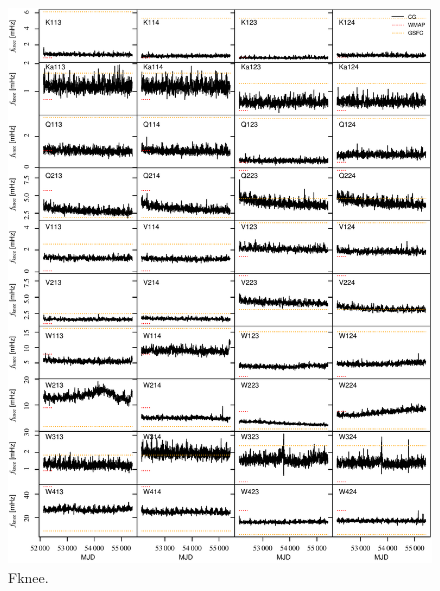 \documentclass[twocolumn]{../../common/aa}
\begin{document}
\begin{figure}[p]
	\centering
	\includegraphics[width=\textwidth]{figures/instpar_CG_fknee_v1.pdf}
	\caption{Fknee.}
	\label{fig:fknee}
\end{figure}
\end{document}
